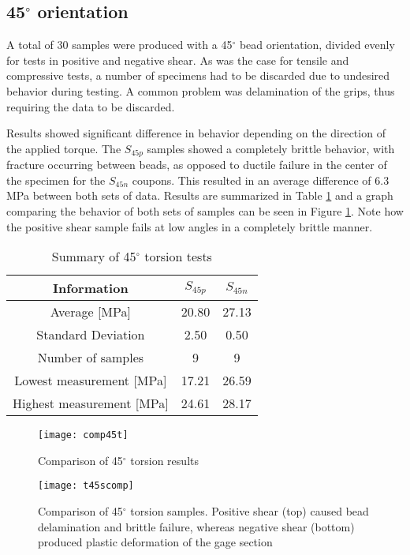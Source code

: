 \documentclass[main.tex]{subfiles}
\begin{document}
\subsection{45$^\circ$ orientation} \label{ssec:45r}
A total of 30 samples were produced with a 45$^\circ$ bead orientation, divided evenly for tests in positive and negative shear. As was the case for tensile and compressive tests, a number of specimens had to be discarded due to undesired behavior during testing. A common problem was delamination of the grips, thus requiring the data to be discarded. 

Results showed significant difference in behavior depending on the direction of the applied torque. The $S_{45p}$ samples showed a completely brittle behavior, with fracture occurring between beads, as opposed to ductile failure in the center of the specimen for the $S_{45n}$ coupons. This resulted in an average difference of 6.3 MPa between both sets of data. Results are summarized in Table \ref{tab:tors45r} and a graph comparing the behavior of both sets of samples can be seen in Figure \ref{fig:45comp}. Note how the positive shear sample fails at low angles in a completely brittle manner.

\begin{table} [h]
	\centering
	\caption{Summary of 45$^\circ$ torsion tests}
\begin{tabular}{ c| c c } 
	\toprule
	\textbf{Information} & $S_{45p}$ & $S_{45n}$\\
	\midrule
	Average [MPa] & 20.80 & 27.13\\
	Standard Deviation & 2.50 & 0.50\\
	Number of samples & 9 & 9\\
	Lowest measurement [MPa] &17.21  & 26.59\\
	Highest measurement [MPa] &24.61 & 28.17\\
	\bottomrule
\end{tabular}
\label{tab:tors45r}
\end{table}

\begin{figure}[!htbp]
	\center
	\texttt{[image: comp45t]}
	\caption{Comparison of 45$^\circ$ torsion results} \label{fig:45comp}
\end{figure}

\begin{figure}[!htbp]
	\center
	\texttt{[image: t45scomp]}
	\captionsetup{justification=centering} %
	\caption[Comparison of 45$^\circ$ torsion results]{Comparison of 45$^\circ$ torsion samples. Positive shear (top) caused bead delamination and brittle failure, whereas negative shear (bottom) produced plastic deformation of the gage section} \label{fig:45scomp}
\end{figure}
  
\end{document}

